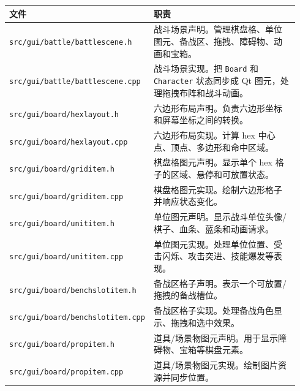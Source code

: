 \documentclass[UTF8,10pt]{ctexart}
\begin{document}
{\small
\begin{longtable}{p{0.34\linewidth}p{0.60\linewidth}}
\toprule
\textbf{文件} & \textbf{职责} \\
\midrule
\texttt{src/\allowbreak{}gui/\allowbreak{}battle/\allowbreak{}battlescene.\allowbreak{}h} & 战斗场景声明。管理棋盘格、单位图元、备战区、拖拽、障碍物、动画和宝箱。 \\
\texttt{src/\allowbreak{}gui/\allowbreak{}battle/\allowbreak{}battlescene.\allowbreak{}cpp} & 战斗场景实现。把 \texttt{Board} 和 \texttt{Character} 状态同步成 Qt 图元，处理拖拽布阵和战斗动画。 \\
\texttt{src/\allowbreak{}gui/\allowbreak{}board/\allowbreak{}hexlayout.\allowbreak{}h} & 六边形布局声明。负责六边形坐标和屏幕坐标之间的转换。 \\
\texttt{src/\allowbreak{}gui/\allowbreak{}board/\allowbreak{}hexlayout.\allowbreak{}cpp} & 六边形布局实现。计算 hex 中心点、顶点、多边形和命中区域。 \\
\texttt{src/\allowbreak{}gui/\allowbreak{}board/\allowbreak{}griditem.\allowbreak{}h} & 棋盘格图元声明。显示单个 hex 格子的区域、悬停和可放置状态。 \\
\texttt{src/\allowbreak{}gui/\allowbreak{}board/\allowbreak{}griditem.\allowbreak{}cpp} & 棋盘格图元实现。绘制六边形格子并响应状态变化。 \\
\texttt{src/\allowbreak{}gui/\allowbreak{}board/\allowbreak{}unititem.\allowbreak{}h} & 单位图元声明。显示战斗单位头像/棋子、血条、蓝条和动画请求。 \\
\texttt{src/\allowbreak{}gui/\allowbreak{}board/\allowbreak{}unititem.\allowbreak{}cpp} & 单位图元实现。处理单位位置、受击闪烁、攻击突进、技能爆发等表现。 \\
\texttt{src/\allowbreak{}gui/\allowbreak{}board/\allowbreak{}benchslotitem.\allowbreak{}h} & 备战区格子声明。表示一个可放置/拖拽的备战槽位。 \\
\texttt{src/\allowbreak{}gui/\allowbreak{}board/\allowbreak{}benchslotitem.\allowbreak{}cpp} & 备战区格子实现。处理备战角色显示、拖拽和选中效果。 \\
\texttt{src/\allowbreak{}gui/\allowbreak{}board/\allowbreak{}propitem.\allowbreak{}h} & 道具/场景物图元声明。用于显示障碍物、宝箱等棋盘元素。 \\
\texttt{src/\allowbreak{}gui/\allowbreak{}board/\allowbreak{}propitem.\allowbreak{}cpp} & 道具/场景物图元实现。绘制图片资源并同步位置。 \\
\bottomrule
\end{longtable}
}
\end{document}
